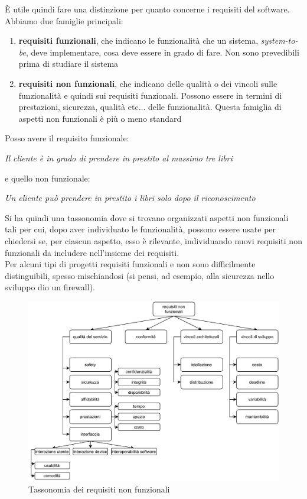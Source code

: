 \documentclass[a4paper,12pt, oneside]{book}
\begin{document}
È utile quindi fare una distinzione per quanto concerne i requisiti del
software. Abbiamo due famiglie principali:
\begin{enumerate}
  \item \textbf{requisiti funzionali}, che indicano le funzionalità che un
  sistema, \textit{system-to-be}, deve implementare, cosa deve essere in grado
  di fare. Non sono prevedibili prima di studiare il sistema
  \item \textbf{requisiti non funzionali}, che indicano delle qualità o dei
  vincoli sulle funzionalità e quindi sui requisiti funzionali. Possono essere
  in termini di prestazioni, sicurezza, qualità etc$\ldots$ delle
  funzionalità. Questa famiglia di aspetti non funzionali è più o meno standard
\end{enumerate}
\begin{esempio}
  Posso avere il requisito funzionale:
  \begin{center}
    \textit{Il cliente è in grado di prendere in prestito al massimo tre libri}
  \end{center}
  e quello non funzionale:
  \begin{center}
    \textit{Un cliente può prendere in prestito i libri solo dopo il
      riconoscimento}  
  \end{center}
\end{esempio}
Si ha quindi una tassonomia dove si trovano organizzati aspetti non funzionali
tali per cui, dopo aver individuato le funzionalità, possono essere usate per
chiedersi se, per ciascun aspetto, esso è rilevante, individuando nuovi requisiti
non funzionali da includere nell'insieme dei requisiti.\\
Per alcuni tipi di progetti requisiti funzionali e non sono difficilmente
distinguibili, spesso mischiandosi (si pensi, ad esempio, alla sicurezza nello
sviluppo dio un firewall).
\begin{figure}[H]
  \centering
  \includegraphics[scale = 0.7]{img/re2.pdf}
  \caption{Tassonomia dei requisiti non funzionali}
\end{figure}
\end{document}

